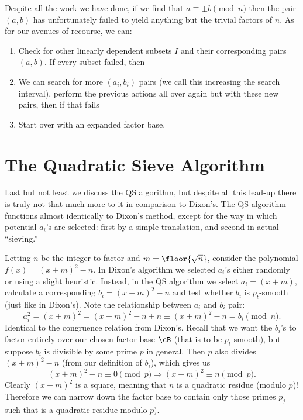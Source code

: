 \documentclass{report}
\begin{document}
Despite all the work we have done, if we find that $a\equiv \pm b\pmod n$ then the pair $(a,b)$
has unfortunately failed to yield anything but the trivial factors of $n$.
As for our avenues of recourse, we can:
\begin{enumerate}
    \item Check for other linearly dependent subsets $I$ and their corresponding pairs $(a,b)$. If
        every subset failed, then
    \item We can search for more $(a_i,b_i)$ pairs (we call this increasing the search interval),
        perform the previous actions all over again but with these new pairs, then if that fails
    \item Start over with an expanded factor base.
\end{enumerate}

\section{The Quadratic Sieve Algorithm}

Last but not least we discuss the QS algorithm, but despite all this lead-up there is truly not that
much more to it in comparison to Dixon's. The QS algorithm functions almost identically to Dixon's
method, except for the way in which potential $a_i$'s are selected: first by a simple translation,
and second in actual ``sieving.''

Letting $n$ be the integer to factor and $m=\floor{\sqrt n}$, consider the polynomial
$f(x)=(x+m)^2-n$. In Dixon's algorithm we selected $a_i$'s either randomly or using a slight
heuristic. Instead, in the QS algorithm we select $a_i=(x+m)$, calculate a corresponding
$b_i=(x+m)^2-n$ and test whether $b_i$ is $p_t$-smooth (just like in Dixon's).
Note the relationship between $a_i$ and $b_i$ pair:
\begin{equation}
    a_i^2
    = (x+m)^2
    = (x+m)^2 - n + n
    \equiv (x+m)^2 - n
    = b_i \pmod n.
\end{equation}
Identical to the congruence relation from Dixon's.
Recall that we want the $b_i$'s to factor entirely over our chosen factor base $\cB$ (that is to be
$p_t$-smooth), but suppose $b_i$ is divisible by some prime $p$ in general. Then $p$ also divides
$(x+m)^2-n$ (from our definition of $b_i$), which gives us
\begin{equation}
    (x+m)^2 - n \equiv 0 \pmod p \Rightarrow
    (x+m)^2 \equiv n \pmod p.
\end{equation}
Clearly $(x+m)^2$ is a square, meaning that $n$ is a quadratic residue (modulo $p$)!
Therefore we can narrow down the factor base to contain only those primes $p_j$ such that
is a quadratic residue modulo $p$).
\end{document}
